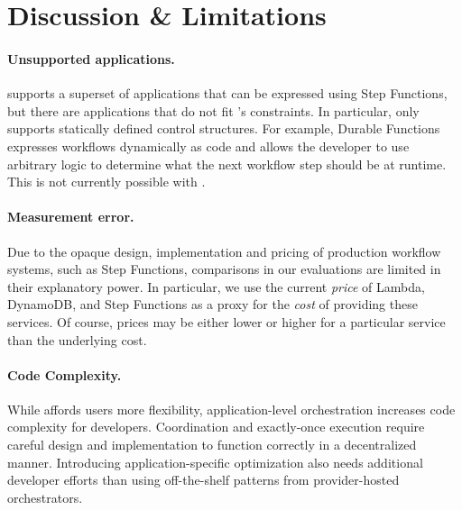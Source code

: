 \section{Discussion \& Limitations}\label{sec:limitations}


\paragraph{Unsupported applications.} \name{} supports a superset of
applications that can be expressed using Step Functions, but there are
applications that do not fit \name{}'s constraints. In particular, \name{}
only supports statically defined control structures. For example, Durable
Functions expresses workflows dynamically as code and allows the developer to
use arbitrary logic to determine what the next workflow step should be at
runtime. This is not currently possible with \name{}.
\vspace{0.1in}
\paragraph{Measurement error.} Due to the opaque design, implementation and
pricing of production workflow systems, such as Step Functions, comparisons in
our evaluations are limited in their explanatory power. In particular, we use
the current \emph{price} of Lambda, DynamoDB, and Step Functions as a proxy
for the \emph{cost} of providing these services. Of course, prices may be
either lower or higher for a particular service than the underlying cost.
\vspace{1ex}
\paragraph{Code Complexity.}While \name{} affords users more flexibility,
application-level orchestration increases code complexity for developers.
Coordination and exactly-once execution require careful design and
implementation to function correctly in a decentralized manner. Introducing
application-specific optimization also needs additional developer efforts than
using off-the-shelf patterns from provider-hosted orchestrators.

